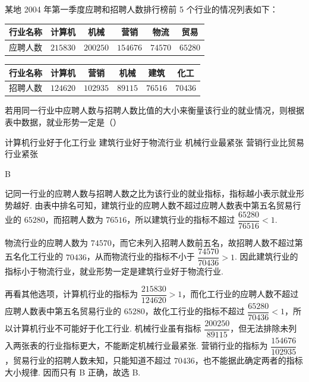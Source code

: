 \begin{problem}
某地 2004 年第一季度应聘和招聘人数排行榜前 5 个行业的情况列表如下：

\begin{center}
\begin{tabular}{|c|c|c|c|c|c|}
\hline
行业名称 & 计算机 & 机械 & 营销 & 物流 & 贸易 \\
\hline
应聘人数 & \(215830\) & \(200250\) & \(154676\) & \(74570\) & \(65280\) \\
\hline
\end{tabular}

\medskip

\begin{tabular}{|c|c|c|c|c|c|}
\hline
行业名称 & 计算机 & 营销 & 机械 & 建筑 & 化工 \\
\hline
招聘人数 & \(124620\) & \(102935\) & \(89115\) & \(76516\) & \(70436\) \\
\hline
\end{tabular}
\end{center}

若用同一行业中应聘人数与招聘人数比值的大小来衡量该行业的就业情况，则根据表中数据，就业形势一定是（\quad）

\choices
    {计算机行业好于化工行业}
    {建筑行业好于物流行业}
    {机械行业最紧张}
    {营销行业比贸易行业紧张}
\end{problem}

\begin{answer}
B
\end{answer}

\begin{solution}
记同一行业的应聘人数与招聘人数之比为该行业的就业指标，指标越小表示就业形势越好. 由表中排名可知，建筑行业的应聘人数不超过应聘人数表中第五名贸易行业的 \(65280\)，而招聘人数为 \(76516\)，所以建筑行业的指标不超过 \(\dfrac{65280}{76516}<1\).

物流行业的应聘人数为 \(74570\)，而它未列入招聘人数前五名，故招聘人数不超过第五名化工行业的 \(70436\)，从而物流行业的指标不小于 \(\dfrac{74570}{70436}>1\). 因此建筑行业的指标小于物流行业，就业形势一定是建筑行业好于物流行业.

再看其他选项，计算机行业的指标为 \(\dfrac{215830}{124620}>1\)，而化工行业的应聘人数不超过应聘人数表中第五名贸易行业的 \(65280\)，故化工行业的指标不超过 \(\dfrac{65280}{70436}<1\)，所以计算机行业不可能好于化工行业. 机械行业虽有指标 \(\dfrac{200250}{89115}\)，但无法排除未列入两张表的行业指标更大，不能断定机械行业最紧张. 营销行业的指标为 \(\dfrac{154676}{102935}\)，贸易行业的招聘人数未知，只能知道不超过 \(70436\)，也不能据此确定两者的指标大小规律. 因而只有 B 正确，故选 B.
\end{solution}

